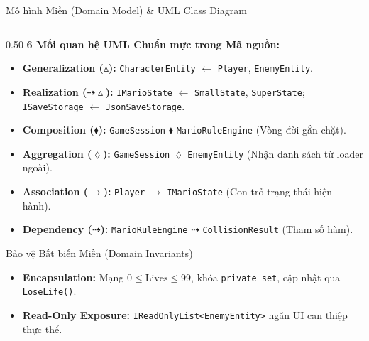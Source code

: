 \documentclass[aspectratio=169, 10pt]{beamer}
\begin{document}
\begin{frame}{Mô hình Miền (Domain Model) \& UML Class Diagram}
    \begin{columns}[T]
        \begin{column}{0.50\textwidth}
            \textbf{\footnotesize \textcolor{HUSTRed}{6 Mối quan hệ UML Chuẩn mực trong Mã nguồn:}}
            \begin{itemize}\scriptsize\setlength{\itemsep}{1.2pt}
                \item \textbf{Generalization ($\vartriangle$):} \texttt{CharacterEntity} $\leftarrow$ \texttt{Player}, \texttt{EnemyEntity}.
                \item \textbf{Realization ($\dashrightarrow\vartriangle$):} \texttt{IMarioState} $\leftarrow$ \texttt{SmallState}, \texttt{SuperState}; \texttt{ISaveStorage} $\leftarrow$ \texttt{JsonSaveStorage}.
                \item \textbf{Composition ($\blacklozenge$):} \texttt{GameSession} $\blacklozenge$ \texttt{MarioRuleEngine} (Vòng đời gắn chặt).
                \item \textbf{Aggregation ($\lozenge$):} \texttt{GameSession} $\lozenge$ \texttt{EnemyEntity} (Nhận danh sách từ loader ngoài).
                \item \textbf{Association ($\rightarrow$):} \texttt{Player} $\rightarrow$ \texttt{IMarioState} (Con trỏ trạng thái hiện hành).
                \item \textbf{Dependency ($\dashrightarrow$):} \texttt{MarioRuleEngine} $\dashrightarrow$ \texttt{CollisionResult} (Tham số hàm).
            \end{itemize}

            \begin{successCard}{Bảo vệ Bất biến Miền (Domain Invariants)}
                \begin{itemize}\scriptsize\setlength{\itemsep}{0.8pt}
                    \item \textbf{Encapsulation:} Mạng $0 \le \text{Lives} \le 99$, khóa \texttt{private set}, cập nhật qua \texttt{LoseLife()}.
                    \item \textbf{Read-Only Exposure:} \texttt{IReadOnlyList<EnemyEntity>} ngăn UI can thiệp thực thể.
                \end{itemize}
            \end{successCard}
        \end{column}


\end{columns}
\end{frame}
\end{document}
